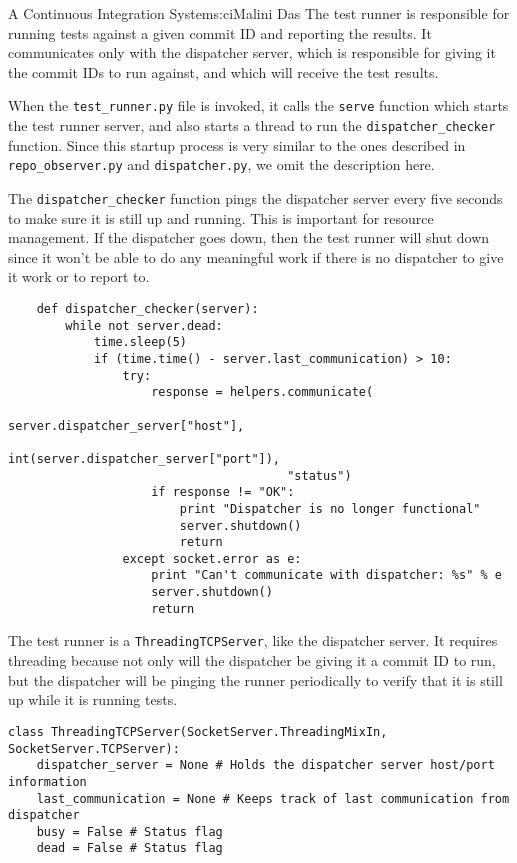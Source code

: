 \begin{aosachapter}{A Continuous Integration System}{s:ci}{Malini Das}
The test runner is responsible for running tests against a given commit
ID and reporting the results. It communicates only with the dispatcher
server, which is responsible for giving it the commit IDs to run
against, and which will receive the test results.

When the \texttt{test\_runner.py} file is invoked, it calls the
\texttt{serve} function which starts the test runner server, and also
starts a thread to run the \texttt{dispatcher\_checker} function. Since
this startup process is very similar to the ones described in
\texttt{repo\_observer.py} and \texttt{dispatcher.py}, we omit the
description here.

The \texttt{dispatcher\_checker} function pings the dispatcher server
every five seconds to make sure it is still up and running. This is
important for resource management. If the dispatcher goes down, then the
test runner will shut down since it won't be able to do any meaningful
work if there is no dispatcher to give it work or to report to.

\begin{verbatim}
    def dispatcher_checker(server):
        while not server.dead:
            time.sleep(5)
            if (time.time() - server.last_communication) > 10:
                try:
                    response = helpers.communicate(
                                       server.dispatcher_server["host"],
                                       int(server.dispatcher_server["port"]),
                                       "status")
                    if response != "OK":
                        print "Dispatcher is no longer functional"
                        server.shutdown()
                        return
                except socket.error as e:
                    print "Can't communicate with dispatcher: %s" % e
                    server.shutdown()
                    return
\end{verbatim}

The test runner is a \texttt{ThreadingTCPServer}, like the dispatcher
server. It requires threading because not only will the dispatcher be
giving it a commit ID to run, but the dispatcher will be pinging the
runner periodically to verify that it is still up while it is running
tests.

\begin{verbatim}
class ThreadingTCPServer(SocketServer.ThreadingMixIn, SocketServer.TCPServer):
    dispatcher_server = None # Holds the dispatcher server host/port information
    last_communication = None # Keeps track of last communication from dispatcher
    busy = False # Status flag
    dead = False # Status flag
\end{verbatim}


\end{aosachapter}
